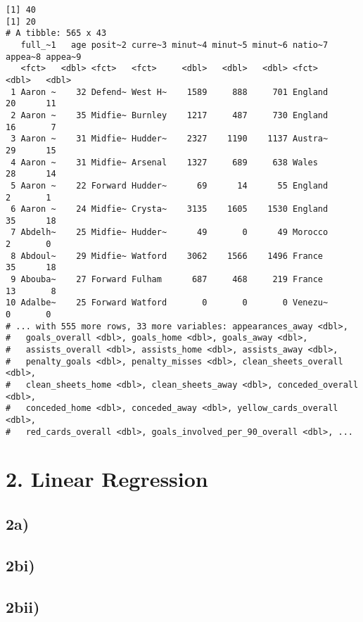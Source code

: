 \documentclass[
]{article}
\begin{document}
\begin{verbatim}
[1] 40
[1] 20
# A tibble: 565 x 43
   full_~1   age posit~2 curre~3 minut~4 minut~5 minut~6 natio~7 appea~8 appea~9
   <fct>   <dbl> <fct>   <fct>     <dbl>   <dbl>   <dbl> <fct>     <dbl>   <dbl>
 1 Aaron ~    32 Defend~ West H~    1589     888     701 England      20      11
 2 Aaron ~    35 Midfie~ Burnley    1217     487     730 England      16       7
 3 Aaron ~    31 Midfie~ Hudder~    2327    1190    1137 Austra~      29      15
 4 Aaron ~    31 Midfie~ Arsenal    1327     689     638 Wales        28      14
 5 Aaron ~    22 Forward Hudder~      69      14      55 England       2       1
 6 Aaron ~    24 Midfie~ Crysta~    3135    1605    1530 England      35      18
 7 Abdelh~    25 Midfie~ Hudder~      49       0      49 Morocco       2       0
 8 Abdoul~    29 Midfie~ Watford    3062    1566    1496 France       35      18
 9 Abouba~    27 Forward Fulham      687     468     219 France       13       8
10 Adalbe~    25 Forward Watford       0       0       0 Venezu~       0       0
# ... with 555 more rows, 33 more variables: appearances_away <dbl>,
#   goals_overall <dbl>, goals_home <dbl>, goals_away <dbl>,
#   assists_overall <dbl>, assists_home <dbl>, assists_away <dbl>,
#   penalty_goals <dbl>, penalty_misses <dbl>, clean_sheets_overall <dbl>,
#   clean_sheets_home <dbl>, clean_sheets_away <dbl>, conceded_overall <dbl>,
#   conceded_home <dbl>, conceded_away <dbl>, yellow_cards_overall <dbl>,
#   red_cards_overall <dbl>, goals_involved_per_90_overall <dbl>, ...
\end{verbatim}

\hypertarget{linear-regression}{%
\section{2. Linear Regression}\label{linear-regression}}

\hypertarget{a-1}{%
\subsection{2a)}\label{a-1}}

\hypertarget{bi}{%
\subsection{2bi)}\label{bi}}

\hypertarget{bii}{%
\subsection{2bii)}\label{bii}}
\end{document}
